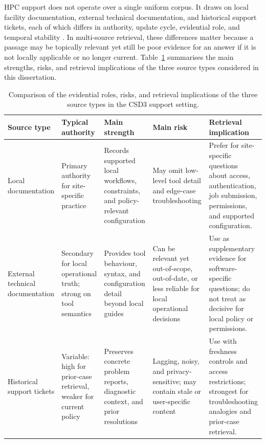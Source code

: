 \ac{HPC} support does not operate over a single uniform corpus. It draws on local facility documentation, external technical documentation, and historical support tickets, each of which differs in authority, update cycle, evidential role, and temporal stability \citep{AskHPC,joslinGeneratingFrequentlyAsked2025,rodenbeckTicketHubEnablingActionable2023,liYouKnowWhat2024,hwangRetrievalAugmentedGenerationEstimation2025}. In multi-source retrieval, these differences matter because a passage may be topically relevant yet still be poor evidence for an answer if it is not locally applicable or no longer current. Table~\ref{tab:source-comparison} summarises the main strengths, risks, and retrieval implications of the three source types considered in this dissertation. 

\begin{table}[t]
\centering
\small
\setlength{\tabcolsep}{4pt}
\begin{tabular}{p{2.1cm} p{2.4cm} p{3.2cm} p{3.4cm} p{3.6cm}}
\hline
Source type & Typical authority & Main strength & Main risk & Retrieval implication \\
\hline
Local documentation &
Primary authority for site-specific practice &
Records supported local workflows, constraints, and policy-relevant configuration \citep{AskHPC,ResearchComputingServicesDocumentation} &
May omit low-level tool detail and edge-case troubleshooting \citep{AskHPC} &
Prefer for site-specific questions about access, authentication, job submission, permissions, and supported configuration. \\
External technical documentation &
Secondary for local operational truth; strong on tool semantics &
Provides tool behaviour, syntax, and configuration detail beyond local guides \citep{AskHPC} &
Can be relevant yet out-of-scope, out-of-date, or less reliable for local operational decisions \citep{liYouKnowWhat2024,hwangRetrievalAugmentedGenerationEstimation2025} &
Use as supplementary evidence for software-specific questions; do not treat as decisive for local policy or permissions. \\
Historical support tickets &
Variable: high for prior-case retrieval, weaker for current policy &
Preserves concrete problem reports, diagnostic context, and prior resolutions \citep{rodenbeckTicketHubEnablingActionable2023,joslinGeneratingFrequentlyAsked2025} &
Lagging, noisy, and privacy-sensitive; may contain stale or user-specific content \citep{rodenbeckTicketHubEnablingActionable2023,joslinGeneratingFrequentlyAsked2025} &
Use with freshness controls and access restrictions; strongest for troubleshooting analogies and prior-case retrieval. \\
\hline
\end{tabular}
\caption{Comparison of the evidential roles, risks, and retrieval implications of the three source types in the \ac{CSD3} support setting.}
\label{tab:source-comparison}
\end{table}

